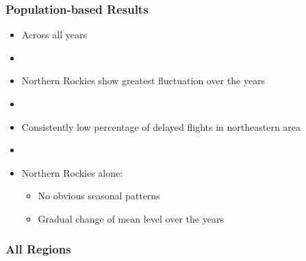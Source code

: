 \documentclass{beamer}
\begin{document}
\begin{frame}
\frametitle{Population-based Results}
\begin{itemize}
\item Across all years

\item[]

\item Northern Rockies show greatest fluctuation over the years

\item[]

\item Consistently low percentage of delayed flights in northeastern area

\item[]

\item Northern Rockies alone:
\begin{itemize}
\item No obvious seasonal patterns
\item Gradual change of mean level over the years
\end{itemize}

\end{itemize}
\end{frame}



\begin{frame}
\frametitle{All Regions}
\begin{center}
\end{center}
\end{frame}
\end{document}
